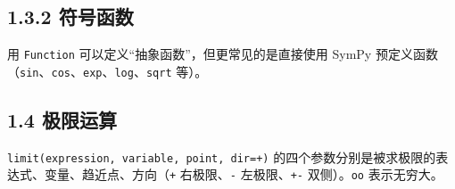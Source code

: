 \begin{Shaded}
\begin{Highlighting}[]
\end{Highlighting}
\end{Shaded}

\subsection{1.3.2 符号函数}\label{ux7b26ux53f7ux51fdux6570}

用 \texttt{Function} 可以定义``抽象函数''，但更常见的是直接使用 SymPy
预定义函数（\texttt{sin}、\texttt{cos}、\texttt{exp}、\texttt{log}、\texttt{sqrt}
等）。

\begin{Shaded}
\begin{Highlighting}[]
\OperatorTok{=}\NormalTok{)}
\OperatorTok{=}

\OperatorTok{=}
\OperatorTok{=}
\OperatorTok{+}
\end{Highlighting}
\end{Shaded}

\begin{Shaded}
\begin{Highlighting}[]
\end{Highlighting}
\end{Shaded}

\subsection{1.4 极限运算}\label{ux6781ux9650ux8fd0ux7b97}

\texttt{limit(expression,\ variable,\ point,\ dir=\textquotesingle{}+\textquotesingle{})}
的四个参数分别是被求极限的表达式、变量、趋近点、方向（\texttt{\textquotesingle{}+\textquotesingle{}}
右极限、\texttt{\textquotesingle{}-\textquotesingle{}}
左极限、\texttt{\textquotesingle{}+-\textquotesingle{}}
双侧）。\texttt{oo} 表示无穷大。

